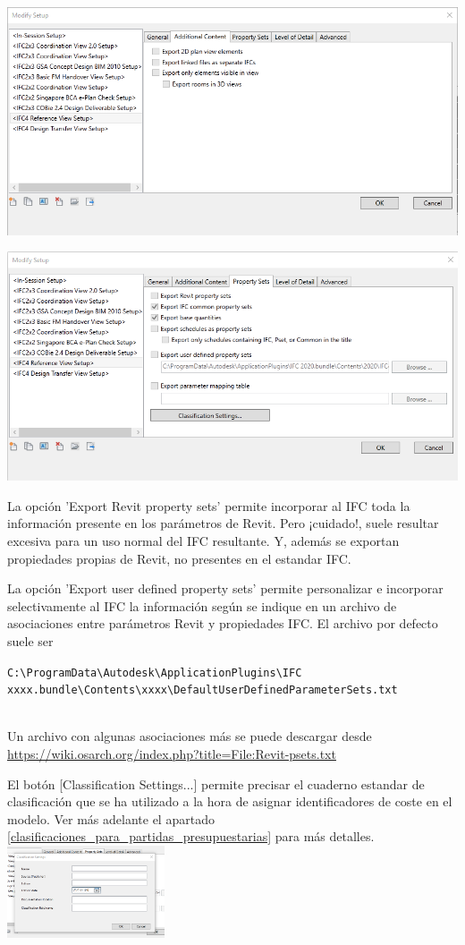 \documentclass[spanish,12pt,a4paper,final,oneside]{book}
\begin{document}
\includegraphics[width=.9\textwidth]{Revit - exportar IFC - modify setup - 2 - additional content}

\includegraphics[width=.9\textwidth]{Revit - exportar IFC - modify setup - 3 - property sets}

La opción 'Export Revit property sets' permite incorporar al IFC toda la información presente en los parámetros de Revit. Pero ¡cuidado!, suele resultar excesiva para un uso normal del IFC resultante. Y, además se exportan propiedades propias de Revit, no presentes en el estandar IFC.

La opción 'Export user defined property sets' permite personalizar e incorporar selectivamente al IFC la información según se indique en un archivo de asociaciones entre parámetros Revit y propiedades IFC. El archivo por defecto suele ser
\\ \begin{footnotesize}\verb!C:\ProgramData\Autodesk\ApplicationPlugins\IFC xxxx.bundle\Contents\xxxx\DefaultUserDefinedParameterSets.txt!\end{footnotesize}
\\Un archivo con algunas asociaciones más se puede descargar desde \url{https://wiki.osarch.org/index.php?title=File:Revit-psets.txt}

El botón [Classification Settings...] permite precisar el cuaderno estandar de clasificación que se ha utilizado a la hora de asignar identificadores de coste en el modelo. Ver más adelante el apartado \ref{clasificaciones_para_partidas_presupuestarias} para más detalles. 
\\ \includegraphics[width=0.35\textwidth]{Revit - exportar IFC - clasificacion settings}
\end{document}
